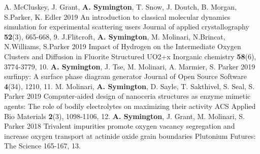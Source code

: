 \begin{cvpubys}
    \cvpuby
        {A. McCluskey, J. Grant, \textbf{A. Symington}, T. Snow, J. Doutch, B. Morgan, S.Parker, K. Edler}
        {2019}
        {An introduction to classical molecular dynamics simulation for experimental scattering users}
        {Journal of applied crystallography}
        {\textbf{52}(3), 665-668,}
        {}
        {9.}
    \cvpuby
        {J.Flitcroft, \textbf{A. Symington}, M. Molinari, N.Brincat, N.Williams, S.Parker}
        {2019}
        {Impact of Hydrogen on the Intermediate Oxygen Clusters and Diffusion in Fluorite Structured UO2+x}
        {Inorganic chemistry}
        {\textbf{58}(6), 3774-3779,}
        {}
        {10.}
    \cvpuby
        {\textbf{A. Symington}, J. Tse, M. Molinari, A. Marmier, S. Parker}
        {2019}
        {surfinpy: A surface phase diagram generator}
        {Journal of Open Source Software}
        {\textbf{4}(34), 1210,}
        {}
        {11.}
    \cvpuby
        {M. Molinari, \textbf{A. Symington}, D. Sayle, T. Sakthivel, S. Seal, S. Parker}
        {2019}
        {Computer-aided design of nanoceria structures as enzyme mimetic agents: The role of bodily electrolytes on maximizing their activity}
        {ACS Applied Bio Materials}
        {\textbf{2}(3), 1098-1106,}
        {}
        {12.}
    \cvpuby
        {\textbf{A. Symington}, J. Grant, M. Molinari, S. Parker}
        {2018}
        {Trivalent impurities promote oxygen vacancy segregation and increase oxygen transport at actinide oxide grain boundaries}
        {Plutonium Futures: The Science }
        {165-167,}
        {}
        {13.}
    \end{cvpubys}
